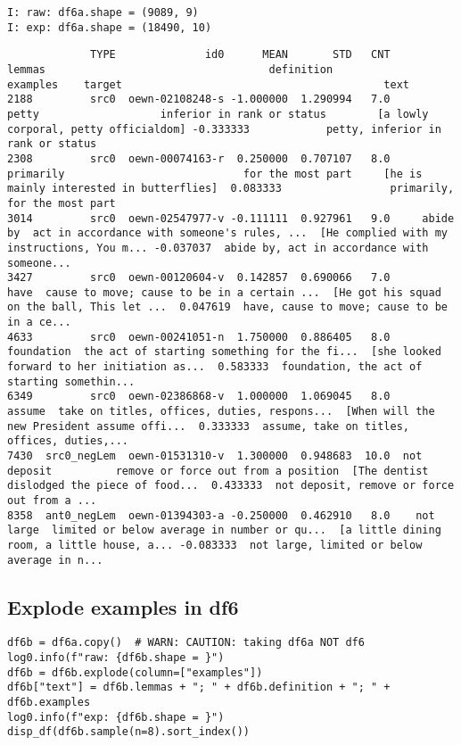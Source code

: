 \documentclass[a4paper,10pt,onecolumn,oneside,openright]{article}
\begin{document}
\begin{verbatim}
I: raw: df6a.shape = (9089, 9)
I: exp: df6a.shape = (18490, 10)
\end{verbatim}
\begin{verbatim}
             TYPE              id0      MEAN       STD   CNT       lemmas                                   definition                                     examples    target                                         text
2188         src0  oewn-02108248-s -1.000000  1.290994   7.0        petty                   inferior in rank or status        [a lowly corporal, petty officialdom] -0.333333            petty, inferior in rank or status
2308         src0  oewn-00074163-r  0.250000  0.707107   8.0    primarily                            for the most part     [he is mainly interested in butterflies]  0.083333                 primarily, for the most part
3014         src0  oewn-02547977-v -0.111111  0.927961   9.0     abide by  act in accordance with someone's rules, ...  [He complied with my instructions, You m... -0.037037  abide by, act in accordance with someone...
3427         src0  oewn-00120604-v  0.142857  0.690066   7.0         have  cause to move; cause to be in a certain ...  [He got his squad on the ball, This let ...  0.047619  have, cause to move; cause to be in a ce...
4633         src0  oewn-00241051-n  1.750000  0.886405   8.0   foundation  the act of starting something for the fi...  [she looked forward to her initiation as...  0.583333  foundation, the act of starting somethin...
6349         src0  oewn-02386868-v  1.000000  1.069045   8.0       assume  take on titles, offices, duties, respons...  [When will the new President assume offi...  0.333333  assume, take on titles, offices, duties,...
7430  src0_negLem  oewn-01531310-v  1.300000  0.948683  10.0  not deposit          remove or force out from a position  [The dentist dislodged the piece of food...  0.433333  not deposit, remove or force out from a ...
8358  ant0_negLem  oewn-01394303-a -0.250000  0.462910   8.0    not large  limited or below average in number or qu...  [a little dining room, a little house, a... -0.083333  not large, limited or below average in n...
\end{verbatim}
\subsection{Explode examples in df6}
\label{sec:org298eb27}
\begin{verbatim}
df6b = df6a.copy()  # WARN: CAUTION: taking df6a NOT df6
log0.info(f"raw: {df6b.shape = }")
df6b = df6b.explode(column=["examples"])
df6b["text"] = df6b.lemmas + "; " + df6b.definition + "; " + df6b.examples
log0.info(f"exp: {df6b.shape = }")
disp_df(df6b.sample(n=8).sort_index())
\end{verbatim}
\end{document}
